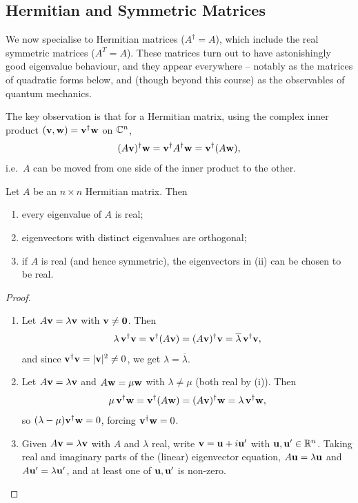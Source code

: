 \documentclass[a4paper]{scrartcl}
\begin{document}
\subsection{Hermitian and Symmetric Matrices}

We now specialise to Hermitian matrices ($A^\dagger = A$), which include the real symmetric matrices ($A^T = A$). These matrices turn out to have astonishingly good eigenvalue behaviour, and they appear everywhere -- notably as the matrices of quadratic forms below, and (though beyond this course) as the observables of quantum mechanics.

The key observation is that for a Hermitian matrix, using the complex inner product $(\mathbf{v}, \mathbf{w}) = \mathbf{v}^\dagger \mathbf{w}$ on $\mathbb{C}^n$,
$$
(A \mathbf{v})^\dagger \mathbf{w} = \mathbf{v}^\dagger A^\dagger \mathbf{w} = \mathbf{v}^\dagger (A \mathbf{w}),
$$
i.e.\ $A$ can be moved from one side of the inner product to the other.

\begin{theorem}
	Let $A$ be an $n \times n$ Hermitian matrix. Then
	\begin{enumerate}[label=(\roman*)]
		\item every eigenvalue of $A$ is real;
		\item eigenvectors with distinct eigenvalues are orthogonal;
		\item if $A$ is real (and hence symmetric), the eigenvectors in (ii) can be chosen to be real.
	\end{enumerate}
\end{theorem}
\begin{proof}
	\begin{enumerate}[label=(\roman*)]
		\item Let $A \mathbf{v} = \lambda \mathbf{v}$ with $\mathbf{v} \neq \mathbf{0}$. Then
		$$
		\lambda\, \mathbf{v}^\dagger \mathbf{v} = \mathbf{v}^\dagger (A\mathbf{v}) = (A \mathbf{v})^\dagger \mathbf{v} = \overline{\lambda}\, \mathbf{v}^\dagger\mathbf{v},
		$$
		and since $\mathbf{v}^\dagger \mathbf{v} = |\mathbf{v}|^2 \neq 0$, we get $\lambda = \overline{\lambda}$.
		\item Let $A \mathbf{v} = \lambda \mathbf{v}$ and $A \mathbf{w} = \mu \mathbf{w}$ with $\lambda \neq \mu$ (both real by (i)). Then
		$$
		\mu \, \mathbf{v}^\dagger \mathbf{w} = \mathbf{v}^\dagger(A \mathbf{w}) = (A \mathbf{v})^\dagger \mathbf{w} = \lambda\, \mathbf{v}^\dagger \mathbf{w},
		$$
		so $(\lambda - \mu)\mathbf{v}^\dagger \mathbf{w} = 0$, forcing $\mathbf{v}^\dagger \mathbf{w} = 0$.
		\item Given $A \mathbf{v} = \lambda \mathbf{v}$ with $A$ and $\lambda$ real, write $\mathbf{v} = \mathbf{u} + i \mathbf{u}'$ with $\mathbf{u}, \mathbf{u}' \in \mathbb{R}^n$. Taking real and imaginary parts of the (linear) eigenvector equation, $A \mathbf{u} = \lambda \mathbf{u}$ and $A \mathbf{u}' = \lambda \mathbf{u}'$, and at least one of $\mathbf{u}, \mathbf{u}'$ is non-zero. \qedhere
	\end{enumerate}
\end{proof}
\end{document}
